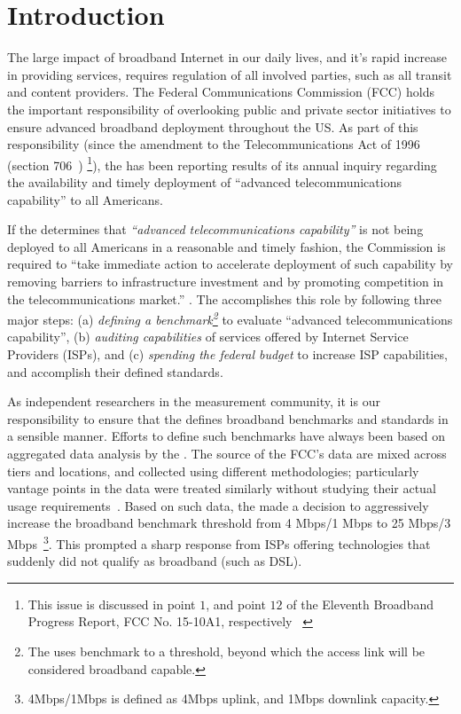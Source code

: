\section{Introduction}
\label{sec:intro}

The large impact of broadband Internet in our daily lives, and it’s rapid increase in providing
services, requires regulation of all involved parties, such as all transit and content providers.
The Federal Communications Commission (FCC) holds the important responsibility of overlooking public
and private sector initiatives to ensure advanced broadband deployment throughout the US. As part of
this responsibility (since the amendment to the Telecommunications Act of 1996 (section 706~\cite{fcc1996telecom-act})
\footnote{This issue is discussed in point $1$, and point $12$ of the Eleventh Broadband Progress Report,
FCC No. 15-10A1, respectively ~\cite{fcc2015progress-report}\label{foot:fcc-issues}}), 
the \FCC has been reporting results of its annual inquiry regarding the
availability and timely deployment of ``advanced telecommunications capability'' to all Americans.


If the \FCC determines that \emph{``advanced telecommunications capability''} is not being deployed
to all Americans in a reasonable and timely fashion, the Commission is required to ``take immediate
action to accelerate deployment of such capability by removing barriers to infrastructure investment
and by promoting competition in the telecommunications market.'' .
The \FCC accomplishes this role by following three major steps:
(a) \emph{defining a benchmark\footnote{The \FCC uses benchmark to a 
threshold, beyond which the access link will be considered broadband capable.}} 
to evaluate ``advanced telecommunications capability'', (b) \emph{auditing
capabilities} of services offered by Internet Service Providers (ISPs), and (c) \emph{spending the
federal budget} to increase ISP capabilities, and accomplish their defined standards.

As independent researchers in the measurement community, it is our responsibility to ensure that the
\FCC defines broadband benchmarks and standards in a sensible manner. Efforts to define such
benchmarks have always been based on aggregated data analysis by the \FCC. The 
source of the FCC's data are mixed across tiers and locations, and collected 
using different methodologies; particularly vantage points in the data were 
treated similarly without studying their actual usage 
requirements~\cite{fcc2015progress-report}. Based on such data, the \FCC made a 
decision to aggressively increase the broadband benchmark threshold from 4 
Mbps/1 Mbps to 25 Mbps/3 Mbps~\cite{fcc-redefine-ieee}\footnote{4Mbps/1Mbps is 
defined as 4Mbps uplink, and 1Mbps downlink capacity.}. This prompted a sharp 
response from ISPs offering technologies that suddenly did not qualify as 
broadband (such as DSL).

